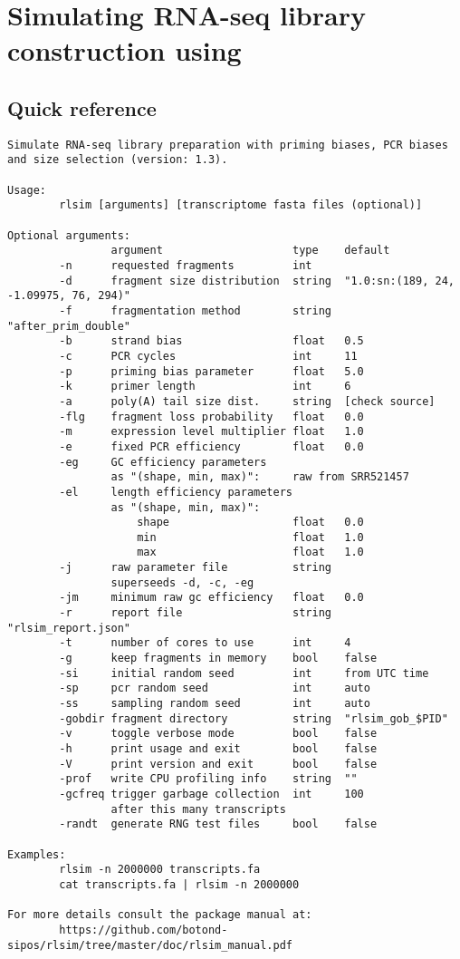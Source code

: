 \section{Simulating RNA-seq library construction using \rlsim}

\subsection{Quick reference}
\label{ss:qrlsim}

\begin{verbatim}
Simulate RNA-seq library preparation with priming biases, PCR biases and size selection (version: 1.3).

Usage:
        rlsim [arguments] [transcriptome fasta files (optional)]

Optional arguments:
                argument                    type    default  
        -n      requested fragments         int     
        -d      fragment size distribution  string  "1.0:sn:(189, 24, -1.09975, 76, 294)" 
        -f      fragmentation method        string  "after_prim_double"
        -b      strand bias                 float   0.5
        -c      PCR cycles                  int     11
        -p      priming bias parameter      float   5.0
        -k      primer length               int     6
        -a      poly(A) tail size dist.     string  [check source]
        -flg    fragment loss probability   float   0.0
        -m      expression level multiplier float   1.0
        -e      fixed PCR efficiency        float   0.0
        -eg     GC efficiency parameters 
                as "(shape, min, max)":     raw from SRR521457
        -el     length efficiency parameters 
                as "(shape, min, max)":
                    shape                   float   0.0
                    min                     float   1.0
                    max                     float   1.0
        -j      raw parameter file          string  
                superseeds -d, -c, -eg
        -jm     minimum raw gc efficiency   float   0.0
        -r      report file                 string  "rlsim_report.json"
        -t      number of cores to use      int     4
        -g      keep fragments in memory    bool    false
        -si     initial random seed         int     from UTC time
        -sp     pcr random seed             int     auto
        -ss     sampling random seed        int     auto
        -gobdir fragment directory          string  "rlsim_gob_$PID"
        -v      toggle verbose mode         bool    false
        -h      print usage and exit        bool    false
        -V      print version and exit      bool    false
        -prof   write CPU profiling info    string  ""
        -gcfreq trigger garbage collection  int     100
                after this many transcripts
        -randt  generate RNG test files     bool    false

Examples:
        rlsim -n 2000000 transcripts.fa
        cat transcripts.fa | rlsim -n 2000000

For more details consult the package manual at:
        https://github.com/botond-sipos/rlsim/tree/master/doc/rlsim_manual.pdf
\end{verbatim}

